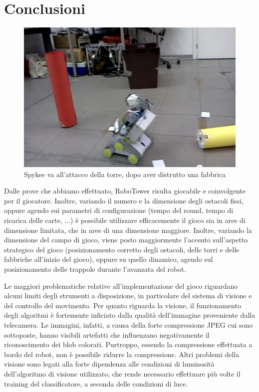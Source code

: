 \chapter{Conclusioni}
\label{cap:conclusioni}

\begin{figure}
\centering
\includegraphics[scale=0.7]{images/attaccotorre}
\caption{Spykee va all'attacco della torre, dopo aver distrutto una fabbrica}
\end{figure}

Dalle prove che abbiamo effettuato, RoboTower risulta giocabile e coinvolgente per il giocatore. Inoltre, variando il numero e la dimensione degli ostacoli fissi, oppure agendo sui parametri di configurazione (tempo del round, tempo di ricarica delle carte, ...) è possibile utilizzare efficacemente il gioco sia in aree di dimensione limitata, che in aree di una dimensione maggiore. Inoltre, variando la dimensione del campo di gioco, viene posto maggiormente l'accento sull'aspetto strategico del gioco (posizionamento corretto degli ostacoli, delle torri e delle fabbriche all'inizio del gioco), oppure su quello dinamico, agendo sul posizionamento delle trappole durante l'avanzata del robot.

Le maggiori problematiche relative all'implementazione del gioco riguardano alcuni limiti degli strumenti a disposizione, in particolare del sistema di visione e del controllo del movimento. Per quanto riguarda la visione, il funzionamento degli algoritmi è fortemente inficiato dalla qualità dell'immagine proveniente dalla telecamera. Le immagini, infatti, a causa della forte compressione JPEG cui sono sottoposte, hanno visibili artefatti che influenzano negativamente il riconoscimento dei blob colorati. Purtroppo, essendo la compressione effettuata a bordo del robot, non è possibile ridurre la compressione. Altri problemi della visione sono legati alla forte dipendenza alle condizioni di luminosità dell'algoritmo di visione utilizzato, che rende necessario effettuare più volte il training del classificatore, a seconda delle condizioni di luce.

